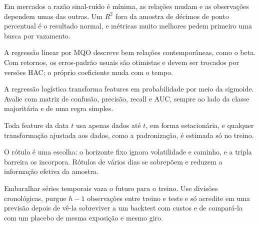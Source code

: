 \begin{resumo}
  \item Em mercados a razão sinal-ruído é mínima, as relações mudam e as observações dependem umas das outras. Um $R^2$ fora da amostra de décimos de ponto percentual é o resultado normal, e métricas muito melhores pedem primeiro uma busca por vazamento.
  \item A regressão linear por MQO descreve bem relações contemporâneas, como o beta. Com retornos, os erros-padrão usuais são otimistas e devem ser trocados por versões HAC; o próprio coeficiente muda com o tempo.
  \item A regressão logística transforma features em probabilidade por meio da sigmoide. Avalie com matriz de confusão, precisão, recall e AUC, sempre ao lado da classe majoritária e de uma regra simples.
  \item Toda feature da data $t$ usa apenas dados até $t$, em forma estacionária, e qualquer transformação ajustada aos dados, como a padronização, é estimada só no treino.
  \item O rótulo é uma escolha: o horizonte fixo ignora volatilidade e caminho, e a tripla barreira os incorpora. Rótulos de vários dias se sobrepõem e reduzem a informação efetiva da amostra.
  \item Embaralhar séries temporais vaza o futuro para o treino. Use divisões cronológicas, purgue $h-1$ observações entre treino e teste e só acredite em uma previsão depois de vê-la sobreviver a um backtest com custos e de compará-la com um placebo de mesma exposição e mesmo giro.
\end{resumo}

